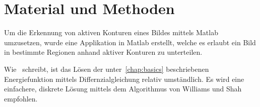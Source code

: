 \chapter{Material und Methoden}
\label{chap:realisation}


% 
% 
Um die Erkennung von aktiven Konturen eines Bildes mittels Matlab umzusetzen, wurde eine Applikation in Matlab erstellt, welche es erlaubt ein Bild in bestimmte Regionen anhand aktiver Konturen zu unterteilen.

Wie~\citet[S. 147]{hudritsch:script:cp} schreibt, ist das Lösen der unter~\ref{chap:basics} beschriebenen Energiefunktion mittels Differnzialgleichung relativ umständlich. Es wird eine einfachere, diskrete Lösung mittels dem Algorithmus von Williams und Shah empfohlen.
